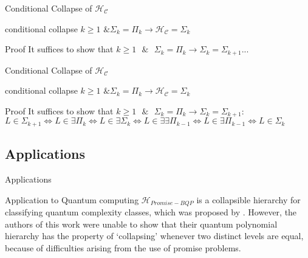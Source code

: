         \begin{frame}{Conditional Collapse of $\mathcal{H}_{\mathcal{C}}$}
            \begin{lemma}{conditional collapse}
                $k \geq 1 \text{ \& } \Sigma_k = \Pi_k \to \mathcal{H}_{\mathcal{C}} = \Sigma_k$
            \end{lemma}
            \pause
            \begin{block}{Proof}
                It suffices to show that 
                $k \geq 1 \text{ $\&$ } \Sigma_k = \Pi_k 
                \to \Sigma_k = \Sigma_{k+1}$...
            \end{block}
        \end{frame}

        \begin{frame}{Conditional Collapse of $\mathcal{H}_{\mathcal{C}}$}
            \begin{lemma}{conditional collapse}
                $k \geq 1 
                \text{ \& } 
                \Sigma_k = \Pi_k \to \mathcal{H}_{\mathcal{C}} = \Sigma_k$
            \end{lemma}
            \begin{block}{Proof}
                It suffices to show that 
                $k \geq 1 
                \text{ $\&$ } 
                \Sigma_k = \Pi_k 
                \to \Sigma_k = \Sigma_{k+1}$:\\
                $L \in \Sigma_{k+1} \iff L \in \exists \Pi_k \iff L \in \exists \Sigma_k \iff L 
                \in \exists \exists \Pi_{k-1} \iff L \in \exists \Pi_{k-1} \iff  L \in \Sigma_k$
            \end{block}
        \end{frame}
        
    \subsection{Applications}
        \begin{frame}{Applications}
            \begin{exampleblock}{Application to Quantum computing}
                $\mathcal{H}_{Promise-BQP}$ is a collapsible hierarchy for classifying quantum complexity classes, which was proposed by \cite{Gharibian}.  However, the authors of this work were unable to show that their quantum polynomial hierarchy has the property of ‘collapsing’ whenever two distinct levels are equal, because of difficulties arising from the use of promise problems.
            \end{exampleblock}
        \end{frame}
        
